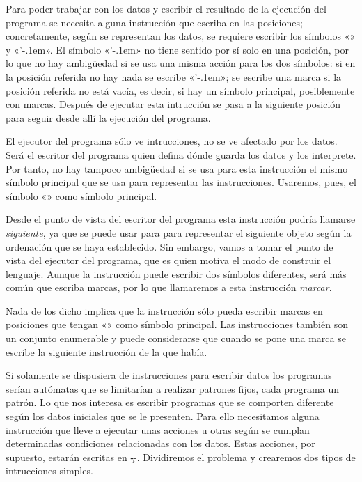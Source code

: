 Para poder trabajar con los datos y escribir el resultado de la ejecución del programa se necesita
alguna instrucción que escriba en las posiciones; concretamente, según se representan los datos, se
requiere escribir los símbolos «» y «{\fcomilla’\kern-.1em}». El símbolo
«{\fcomilla’\kern-.1em}» no tiene sentido por sí solo en una posición, por lo que no hay ambigüedad
si se usa una misma acción para los dos símbolos: si en la posición referida no hay nada se escribe
«{\fcomilla’\kern-.1em}»; se escribe una marca si la posición referida no está vacía, es decir, si
hay un símbolo principal, posiblemente con marcas. Después de ejecutar esta intrucción se pasa a la
siguiente posición para seguir desde allí la ejecución del programa.

El ejecutor del programa sólo ve intrucciones, no se ve afectado por los datos. Será el escritor del
programa quien defina dónde guarda los datos y los interprete. Por tanto, no hay tampoco ambigüedad
si se usa para esta instrucción el mismo símbolo principal que se usa para representar las
instrucciones. Usaremos, pues, el símbolo «» como símbolo principal.

Desde el punto de vista del escritor del programa esta instrucción podría llamarse {\it siguiente},
ya que se puede usar para para representar el siguiente objeto según la ordenación que se haya
establecido. Sin embargo, vamos a tomar el punto de vista del ejecutor del programa, que es quien
motiva el modo de construir el lenguaje. Aunque la instrucción puede escribir dos símbolos
diferentes, será más común que escriba marcas, por lo que llamaremos a esta instrucción {\it
marcar}.

Nada de los dicho implica que la instrucción sólo pueda escribir marcas en posiciones que tengan
«» como símbolo principal. Las instrucciones también son un conjunto enumerable y puede
considerarse que cuando se pone una marca se escribe la siguiente instrucción de la que había.

Si solamente se dispusiera de instrucciones para escribir datos los programas serían autómatas que
se limitarían a realizar patrones fijos, cada programa un patrón. Lo que nos interesa es escribir
programas que se comporten diferente según los datos iniciales que se le presenten. Para ello
necesitamos alguna instrucción que lleve a ejecutar unas acciones u otras según se cumplan
determinadas condiciones relacionadas con los datos. Estas acciones, por supuesto, estarán escritas
en \c--. Dividiremos el problema y crearemos dos tipos de intrucciones simples.

